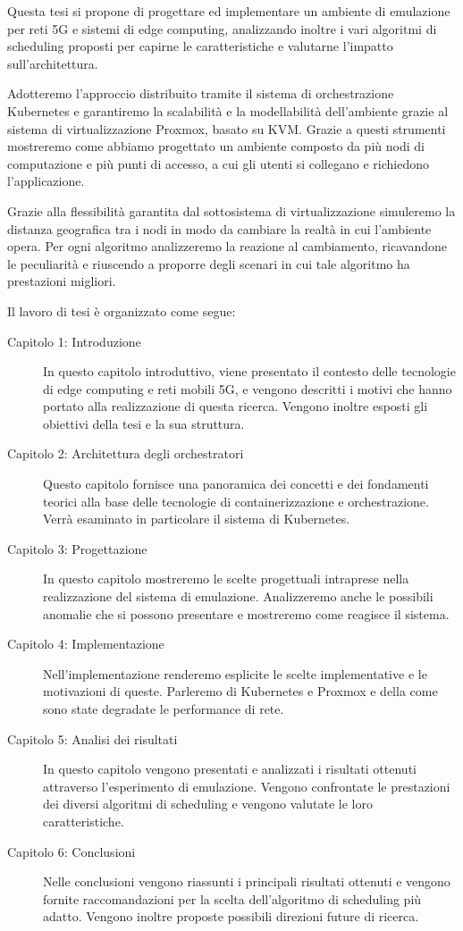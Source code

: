 \documentclass[12pt, hidelinks]{report}
\begin{document}
Questa tesi si propone di progettare ed implementare un ambiente di emulazione per reti 5G e sistemi di edge computing, analizzando inoltre i vari algoritmi di scheduling proposti per capirne le caratteristiche e valutarne l'impatto sull'architettura. 

Adotteremo l'approccio distribuito tramite il sistema di orchestrazione Kubernetes e garantiremo la scalabilità e la modellabilità dell'ambiente grazie al sistema di virtualizzazione Proxmox, basato su KVM. Grazie a questi strumenti mostreremo come abbiamo progettato un ambiente composto da più nodi di computazione e più punti di accesso, a cui gli utenti si collegano e richiedono l'applicazione.

Grazie alla flessibilità garantita dal sottosistema di virtualizzazione simuleremo la distanza geografica tra i nodi in modo da cambiare la realtà in cui l'ambiente opera. Per ogni algoritmo analizzeremo la reazione al cambiamento, ricavandone le peculiarità e riuscendo a proporre degli scenari in cui tale algoritmo ha prestazioni migliori.


Il lavoro di tesi è organizzato come segue:
\begin{description}
\item[Capitolo 1: Introduzione] In questo capitolo introduttivo, viene presentato il contesto delle tecnologie di edge computing e reti mobili 5G, e vengono descritti i motivi che hanno portato alla realizzazione di questa ricerca. Vengono inoltre esposti gli obiettivi della tesi e la sua struttura.
\item[Capitolo 2: Architettura degli orchestratori] Questo capitolo fornisce una panoramica dei concetti e dei fondamenti teorici alla base delle tecnologie di containerizzazione e orchestrazione. Verrà esaminato in particolare il sistema di Kubernetes.
\item[Capitolo 3: Progettazione] In questo capitolo mostreremo le scelte progettuali intraprese nella realizzazione del sistema di emulazione. Analizzeremo anche le possibili anomalie che si possono presentare e mostreremo come reagisce il sistema.
\item[Capitolo 4: Implementazione] Nell'implementazione renderemo esplicite le scelte implementative e le motivazioni di queste. Parleremo di Kubernetes e Proxmox e della come sono state degradate le performance di rete.
\item[Capitolo 5: Analisi dei risultati] In questo capitolo vengono presentati e analizzati i risultati ottenuti attraverso l'esperimento di emulazione. Vengono confrontate le prestazioni dei diversi algoritmi di scheduling e vengono valutate le loro caratteristiche.
\item[Capitolo 6: Conclusioni] Nelle conclusioni vengono riassunti i principali risultati ottenuti e vengono fornite raccomandazioni per la scelta dell'algoritmo di scheduling più adatto. Vengono inoltre proposte possibili direzioni future di ricerca.
\end{description}
\end{document}

